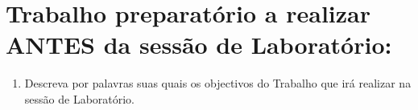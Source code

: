 \documentclass[a4paper,12pt]{article}  %
\begin{document}
\section{\sf Trabalho preparatório a realizar  ANTES da sessão de Laboratório:}
\begin{enumerate}
\item Descreva por palavras suas quais os objectivos do Trabalho que irá realizar na sessão de Laboratório.

\end{enumerate}

\noindent\underline{\makebox[\textwidth][r]{~}} \\
\noindent\underline{\makebox[\textwidth][r]{~}} \\
\noindent\underline{\makebox[\textwidth][r]{~}} \\
\noindent\underline{\makebox[\textwidth][r]{~}} \\
\noindent\underline{\makebox[\textwidth][r]{~}} \\
\noindent\underline{\makebox[\textwidth][r]{~}} \\
\noindent\underline{\makebox[\textwidth][r]{~}} \\

\end{document}
